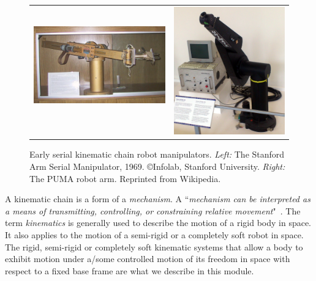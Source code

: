  \begin{figure}[b!]
 	\centering
 	\begin{tabular}{@{}c@{}c@{}}
 		\includegraphics[width=0.50\linewidth ,height=0.4\columnwidth]{figures/StanfordArm.jpg} \,\,
 		&
 		\includegraphics[width=0.48\columnwidth,height=0.4\columnwidth]{figures/PUMA.jpg}
 	\end{tabular}
 	\caption{Early serial kinematic chain robot manipulators. \textit{Left:} The Stanford Arm Serial Manipulator, 1969. \copyright Infolab, Stanford University. \textit{Right:}  The PUMA robot arm. Reprinted from Wikipedia.}
 	\label{fig:robot_arms}
 \end{figure}
A kinematic chain is a form of a \textit{mechanism}. A ``\textit{mechanism can be interpreted as a means of transmitting, controlling, or constraining relative movement}"~\cite{HuntBook1977}. The term \textit{kinematics} is generally used to describe the motion of a rigid body in space. It also applies to the motion of a semi-rigid or a  completely soft robot in space.  The rigid, semi-rigid or completely soft kinematic systems that allow a body to exhibit motion under a/some controlled motion of its freedom in space with respect to a fixed base frame are what we describe in this module.

